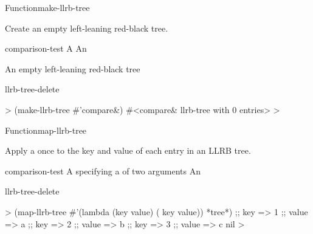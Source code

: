 \documentclass[10pt,twoside,english,pdftex]{article}
\begin{document}

\begin{functiondoc}{Function}{make-llrb-tree}{
    }
%

\fnsyntax

\fnpurpose Create an empty left-leaning red-black tree.

\fnpackage {}

\fnmodule {}

\fnargs
\begin{args}{comparison-test}
 A 
 An 
\end{args}

\fnreturns An empty left-leaning red-black tree

\begin{alsos}{llrb-tree-delete}
\end{alsos}

\fnexample
%
\W\supp
\begin{example}
  > (make-llrb-tree #'compare\&)
  #<compare\& llrb-tree with 0 entries>
  >
\end{example}

\end{functiondoc}


\begin{functiondoc}{Function}{map-llrb-tree}{%
    }
%

\fnsyntax

\fnpurpose Apply a  once to the key and value of each entry in
an LLRB tree.

\fnpackage {}

\fnmodule {}

\fnargs
\begin{args}{comparison-test}
\arg[function] A  specifying a
  of two arguments
 An 
\end{args}

\begin{alsos}{llrb-tree-delete}
\end{alsos}

\fnexample
%
\W\supp
\begin{example}
  > (map-llrb-tree 
      #'(lambda (key value)
          ( key value))
    *tree*)
  ;;  key => 1
  ;;  value => a
  ;;  key => 2
  ;;  value => b
  ;;  key => 3
  ;;  value => c
  nil
  >
\end{example}

\end{functiondoc}
\end{document}
